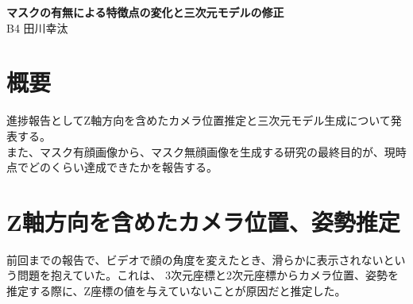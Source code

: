 \documentclass[]{jarticle}          %
\begin{document}

\vspace*{2ex}
\begin{center}
 {\Large \bf マスクの有無による特徴点の変化と三次元モデルの修正}\\ %
 \vspace*{5mm}
 {\large B4 田川幸汰}%
\end{center}






\section{概要}
進捗報告としてZ軸方向を含めたカメラ位置推定と三次元モデル生成について発表する。 \\
また、マスク有顔画像から、マスク無顔画像を生成する研究の最終目的が、現時点でどのくらい達成できたかを報告する。

\section{Z軸方向を含めたカメラ位置、姿勢推定}
前回までの報告で、ビデオで顔の角度を変えたとき、滑らかに表示されないという問題を抱えていた。これは、
3次元座標と2次元座標からカメラ位置、姿勢を推定する際に、Z座標の値を与えていないことが原因だと推定した。
\end{document}
